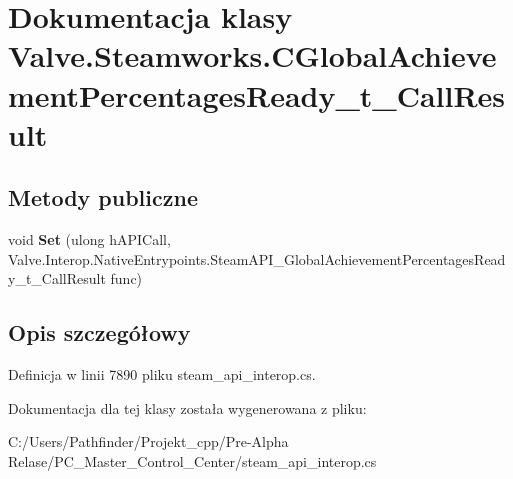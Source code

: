 \hypertarget{class_valve_1_1_steamworks_1_1_c_global_achievement_percentages_ready__t___call_result}{}\section{Dokumentacja klasy Valve.\+Steamworks.\+C\+Global\+Achievement\+Percentages\+Ready\+\_\+t\+\_\+\+Call\+Result}
\label{class_valve_1_1_steamworks_1_1_c_global_achievement_percentages_ready__t___call_result}
\subsection*{Metody publiczne}
\begin{DoxyCompactItemize}
\item 
\mbox{\label{class_valve_1_1_steamworks_1_1_c_global_achievement_percentages_ready__t___call_result_aab29ce30e7171c8961a1b89617e6f835}} 
void {\bfseries Set} (ulong h\+A\+P\+I\+Call, Valve.\+Interop.\+Native\+Entrypoints.\+Steam\+A\+P\+I\+\_\+\+Global\+Achievement\+Percentages\+Ready\+\_\+t\+\_\+\+Call\+Result func)
\end{DoxyCompactItemize}


\subsection{Opis szczegółowy}


Definicja w linii 7890 pliku steam\+\_\+api\+\_\+interop.\+cs.



Dokumentacja dla tej klasy została wygenerowana z pliku\+:\begin{DoxyCompactItemize}
\item 
C\+:/\+Users/\+Pathfinder/\+Projekt\+\_\+cpp/\+Pre-\/\+Alpha Relase/\+P\+C\+\_\+\+Master\+\_\+\+Control\+\_\+\+Center/steam\+\_\+api\+\_\+interop.\+cs\end{DoxyCompactItemize}
